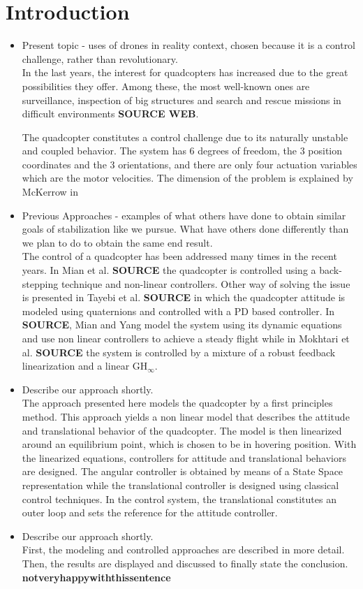 \section{Introduction}
\begin{itemize}
\item Present topic - uses of drones in reality context, chosen because it is a control challenge, rather than revolutionary.\\
In the last years, the interest for quadcopters has increased due to the great possibilities they offer. Among these, the most well-known ones are surveillance, inspection of big structures and search and rescue missions in difficult environments \textbf{SOURCE WEB}.

The quadcopter constitutes a control challenge due to its naturally unstable and coupled behavior. The system has 6 degrees of freedom, the 3 position coordinates and the 3 orientations, and there are only four actuation variables which are the motor velocities. The dimension of the problem is explained by McKerrow in %

\item Previous Approaches - examples of what others have done to obtain similar goals of stabilization like we pursue. What have others done differently than we plan to do to obtain the same end result. \\ 
The control of a quadcopter has been addressed many times in the recent years. In Mian et al. \textbf{SOURCE} the quadcopter is controlled using a back-stepping technique and non-linear controllers. Other way of solving the issue is presented in Tayebi et al. \textbf{SOURCE} in which the quadcopter attitude is modeled using quaternions and controlled with a PD based controller. In \textbf{SOURCE}, Mian and Yang model the system using its dynamic equations and use non linear controllers to achieve a steady flight while in Mokhtari et al. \textbf{SOURCE} the system is controlled by a mixture of a robust feedback linearization and a linear GH$_{\infty}$.

\item Describe our approach shortly.\\
The approach presented here models the quadcopter by a first principles method. This approach yields a non linear model that describes the attitude and translational behavior of the quadcopter. The model is then linearized around an equilibrium point, which is chosen to be in hovering position. With the linearized equations, controllers for attitude and translational behaviors are designed. The angular controller is obtained by means of a State Space representation while the translational controller is designed using classical control techniques. In the control system, the translational constitutes an outer loop  and sets the reference for the attitude controller.
\item Describe our approach shortly.\\
First, the modeling and controlled approaches are described in more detail. Then, the results are displayed and discussed to finally state the conclusion. \textbf{notveryhappywiththissentence}
\end{itemize}

